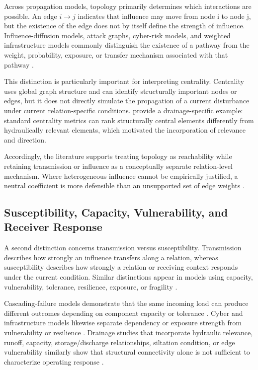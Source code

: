 Across propagation models, topology primarily determines which
interactions are possible. An edge $i\to j$ indicates that influence may move
from node i to node j, but the existence of the edge does not by itself
define the strength of influence. Influence-diffusion models, attack
graphs, cyber-risk models, and weighted infrastructure models commonly
distinguish the existence of a pathway from the weight, probability,
exposure, or transfer mechanism associated with that pathway
\citep{kempe2003,sheyner2002,kavallieratos2021,faraji2026,petrone2018}.

This distinction is particularly important for interpreting centrality.
Centrality uses global graph structure and can identify structurally
important nodes or edges, but it does not directly simulate the
propagation of a current disturbance under current relation-specific
conditions. \citet{simone2022} provide a drainage-specific example:
standard centrality metrics can rank structurally central elements
differently from hydraulically relevant elements, which motivated the
incorporation of relevance and direction.

Accordingly, the literature supports treating topology as reachability
while retaining transmission or influence as a conceptually separate
relation-level mechanism. Where heterogeneous influence cannot be
empirically justified, a neutral coefficient is more defensible than an
unsupported set of edge weights \citep{kempe2003,simone2022,dastgir2023}.

\subsection{Susceptibility, Capacity, Vulnerability, and Receiver
Response}\label{susceptibility-capacity-vulnerability-and-receiver-response}

A second distinction concerns transmission versus susceptibility.
Transmission describes how strongly an influence transfers along a
relation, whereas susceptibility describes how strongly a relation or
receiving context responds under the current condition. Similar
distinctions appear in models using capacity, vulnerability, tolerance,
resilience, exposure, or fragility \citep{buldyrev2010,he2019,
kavallieratos2021,faraji2026}.

Cascading-failure models demonstrate that the same incoming load can
produce different outcomes depending on component capacity or tolerance
\citep{buldyrev2010,he2019,shuang2017}. Cyber and infrastructure models likewise separate
dependency or exposure strength from vulnerability or resilience
\citep{kavallieratos2021,faraji2026,zhou2023}. Drainage studies that incorporate hydraulic
relevance, runoff, capacity, storage/discharge relationships, siltation
condition, or edge vulnerability similarly show that structural
connectivity alone is not sufficient to characterize operating response
\citep{simone2022,simone2023,reyes2020,dastgir2023,dastgir2024,meijer2023,zhang2025}.

